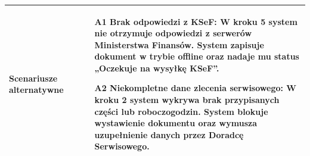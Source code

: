 \begin{longtable}{|p{4cm}|p{11cm}|}
Scenariusze alternatywne &
\begin{itemize}
\item [A1] Brak odpowiedzi z KSeF: W kroku 5 system nie otrzymuje odpowiedzi z serwerów Ministerstwa Finansów. System zapisuje dokument w trybie offline oraz nadaje mu status „Oczekuje na wysyłkę KSeF”.
\item [A2] Niekompletne dane zlecenia serwisowego: W kroku 2 system wykrywa brak przypisanych części lub roboczogodzin. System blokuje wystawienie dokumentu oraz wymusza uzupełnienie danych przez Doradcę Serwisowego.
\end{itemize}
\\
\hline

\end{longtable}